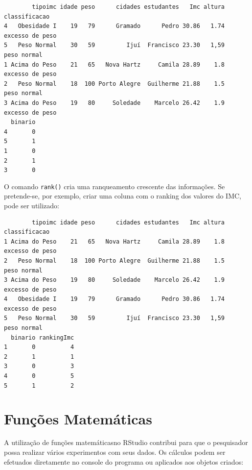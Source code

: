 \documentclass[12pt,brazil,oneside]{book}
\newenvironment{Shaded}{\begin{snugshade}}{\end{snugshade}}
\newcommand{\KeywordTok}[1]{\textcolor[rgb]{0.13,0.29,0.53}{\textbf{#1}}}
\newcommand{\NormalTok}[1]{#1}
\newcommand{\OperatorTok}[1]{\textcolor[rgb]{0.81,0.36,0.00}{\textbf{#1}}}
\begin{document}
\begin{verbatim}
        tipoimc idade peso      cidades estudantes   Imc altura   classificacao
4   Obesidade I    19   79      Gramado      Pedro 30.86   1.74 excesso de peso
5   Peso Normal    30   59         Ijuí  Francisco 23.30   1,59     peso normal
1 Acima do Peso    21   65   Nova Hartz     Camila 28.89    1.8 excesso de peso
2   Peso Normal    18  100 Porto Alegre  Guilherme 21.88    1.5     peso normal
3 Acima do Peso    19   80     Soledade    Marcelo 26.42    1.9 excesso de peso
  binario
4       0
5       1
1       0
2       1
3       0
\end{verbatim}

O comando \texttt{rank()} cria uma ranqueamento crescente das
informações. Se pretende-se, por exemplo, criar uma coluna com o ranking
dos valores do IMC, pode ser utilizado:

\begin{Shaded}
\end{Shaded}

\begin{verbatim}
        tipoimc idade peso      cidades estudantes   Imc altura   classificacao
1 Acima do Peso    21   65   Nova Hartz     Camila 28.89    1.8 excesso de peso
2   Peso Normal    18  100 Porto Alegre  Guilherme 21.88    1.5     peso normal
3 Acima do Peso    19   80     Soledade    Marcelo 26.42    1.9 excesso de peso
4   Obesidade I    19   79      Gramado      Pedro 30.86   1.74 excesso de peso
5   Peso Normal    30   59         Ijuí  Francisco 23.30   1,59     peso normal
  binario rankingImc
1       0          4
2       1          1
3       0          3
4       0          5
5       1          2
\end{verbatim}

\hypertarget{funcoes-matematicas}{%
\section{Funções Matemáticas}\label{funcoes-matematicas}}

A utilização de funções matemáticasno RStudio contribui para que o
pesquisador possa realizar vários experimentos com seus dados. Os
cálculos podem ser efetuados diretamente no console do programa ou
aplicados aos objetos criados:
\end{document}
